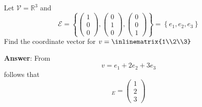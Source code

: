 \begin{exm}
	Let $\mathcal{V}=\mathbb{R}^3$ and
	\begin{equation*}
		\mathcal{E}=\left\{
		\begin{pmatrix}
			1 \\0\\0
		\end{pmatrix},
		\begin{pmatrix}
			0 \\1\\0
		\end{pmatrix},
		\begin{pmatrix}
			0 \\0\\1
		\end{pmatrix}
		\right\}=\left\{
		e_1,e_2,e_3
		\right\}
	\end{equation*}
	Find the coordinate vector for $v=\inlinematrix{1\\2\\3}$
	\begin{flushleft}
		\textbf{Answer}: From
		\begin{equation*}
			v = e_1 + 2e_2 + 3e_3
		\end{equation*}
		follows that
		\begin{equation*}
			[v]_E=\begin{pmatrix}
				1 \\2\\3
			\end{pmatrix}
		\end{equation*}
	\end{flushleft}
\end{exm}


